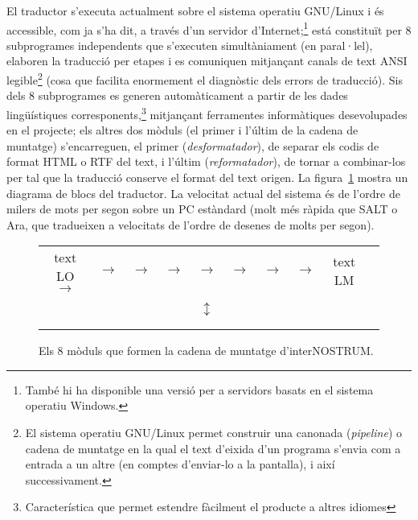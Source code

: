 El traductor s'executa actualment sobre el sistema operatiu GNU/Linux i és
accessible, com ja s'ha dit, a través d'un servidor
d'Internet;\footnote{També hi ha disponible una versió per a servidors
  basats en el sistema operatiu Windows.} está constituït per 8
subprogrames independents que s'executen simultàniament (en
paral·lel), elaboren la traducció per etapes i es comuniquen
mitjançant canals de text ANSI legible\footnote{El sistema operatiu
  GNU/Linux permet construir una canonada (\emph{pipeline}) o cadena de
  muntatge en la qual el text d'eixida d'un programa s'envia com a
  entrada a un altre (en comptes d'enviar-lo a la pantalla), i així
  successivament.} (cosa que facilita enormement el diagnòstic dels
errors de traducció). Sis dels 8 subprogrames es generen
automàticament a partir de les dades lingüístiques
corresponents,\footnote{Característica que permet estendre fàcilment
  el producte a altres idiomes} mitjançant ferramentes informàtiques
desevolupades en el projecte; els altres dos mòduls (el primer i
l'últim de la cadena de muntatge) s'encarreguen, el primer
(\emph{desformatador}), de separar els codis de format HTML o RTF del
text, i l'últim (\emph{reformatador}), de tornar a combinar-los per
tal que la traducció conserve el format del text origen.  La
figura~\ref{fg:modules} mostra un diagrama de blocs del traductor. La
velocitat actual del sistema és de l'ordre de milers de mots per segon
sobre un PC estàndard (molt més ràpida que SALT o Ara, que tradueixen
a velocitats de l'ordre de desenes de molts per segon).

\begin{figure}
{\small
\setlength{\tabcolsep}{0.5mm}
\begin{center}
\begin{tabular}{cccccccccc}
\\
\parbox{0.7cm}{text LO} $\rightarrow$ &
 $\rightarrow$ &
  $\rightarrow$ &
 $\rightarrow$ &  $\rightarrow$ &
$\rightarrow$ & 
$\rightarrow$ &  $\rightarrow$ &
\parbox{0.7cm}{text LM}\\\\
& &  & & $\updownarrow$   & \\\\
& &
 &  &                 &   \\
\end{tabular}
\end{center}
}
\caption{Els 8 mòduls que formen la cadena de muntatge d'interNOSTRUM.}
\label{fg:modules}
\end{figure}



